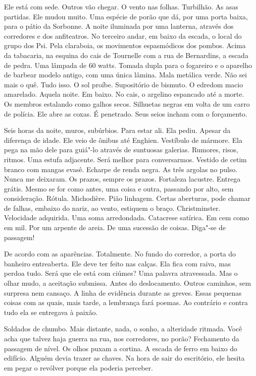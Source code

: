 Ele está com sede. Outros vão chegar. O vento nas folhas. Turbilhão. As
asas partidas. Ele mudou muito. Uma espécie de porão que dá, por uma
porta baixa, para o pátio da Sorbonne. A noite iluminada por uma
lanterna, através dos corredores e dos anfiteatros. No terceiro andar,
em baixo da escada, o local do grupo dos Psi. Pela claraboia, os
movimentos espasmódicos dos pombos. Acima da tabacaria, na esquina do
cais de Tournelle com a rua de Bernardins, a escada de pedra. Uma
lâmpada de 60 watts. Tomada dupla para o fogareiro e o aparelho de
barbear modelo antigo, com uma única lâmina. Mala metálica verde. Não
sei mais o quê. Tudo isso. O sol proíbe. Supositório de bismuto. O
edredom macio amarelado. Aquela noite. Em baixo. No cais, o argelino
espancado até a morte. Os membros estalando como galhos secos. Silhuetas
negras em volta de um carro de polícia. Ele abre as coxas. É penetrado.
Seus seios incham com o forçamento.

Seis horas da noite, muros, subúrbios. Para estar ali. Ela pediu. Apesar
da diferença de idade. Ele veio de ônibus até Enghien. Vestíbulo de
mármore. Ela pega na mão dele para guiá"-lo através de suntuosas
galerias. Rumores, risos, ritmos. Uma estufa adjacente. Será melhor para
conversarmos. Vestido de cetim branco com mangas evasê. Echarpe de renda
negra. As três argolas no pulso. Nunca me deixaram. Os prazos, sempre os
prazos. Fortaleza lacustre. Entrega grátis. Mesmo se for como antes, uma
coisa e outra, passando por alto, sem consideração. Rótula. Michodière.
Pião linhagem. Certas aberturas, pode chamar de falhas, embaixo do
nariz, ao vento, estiquem o braço. Christminster. Velocidade adquirida.
Uma soma arredondada. Catacrese satírica. Em cem como em mil. Por um
arpente de areia. De uma sucessão de coisas. Diga"-se de passagem!

De acordo com as aparências. Totalmente. No fundo do corredor, a porta
do banheiro entreaberta. Ele deve ter feito nas calças. Ela fica com
raiva, mas perdoa tudo. Será que ele está com ciúmes? Uma palavra
atravessada. Mas o olhar mudo, a aceitação submissa. Antes do
deslocamento. Outros caminhos, sem surpresa nem cansaço. A linha de
evidência durante as greves. Essas pequenas coisas com as quais, mais
tarde, a lembrança fará poemas. Ao contrário e contra tudo ela se
entregava à paixão.

Soldados de chumbo. Mais distante, nada, o sonho, a alteridade ritmada.
Você acha que talvez haja guerra na rua, nos corredores, no porão?
Fechamento da passagem de nível. Os olhos puxam a cortina. A escada de
ferro em baixo do edifício. Alguém devia trazer as chaves. Na hora de
sair do escritório, ele hesita em pegar o revólver porque ela poderia
perceber.

